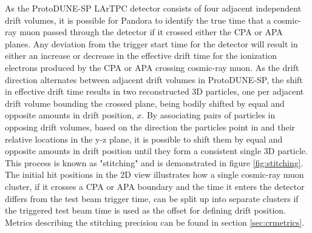 As the ProtoDUNE-SP LArTPC detector consists of four adjacent independent drift volumes, it is possible for Pandora to identify the true time that a cosmic-ray muon passed through the detector if it crossed either the CPA or APA planes.  Any deviation from the trigger start time for the detector will result in either an increase or decrease in the effective drift time for the ionization electrons produced by the CPA or APA crossing cosmic-ray muon.  As the drift direction alternates between adjacent drift volumes in ProtoDUNE-SP, the shift in effective drift time results in two reconstructed 3D particles, one per adjacent drift volume bounding the crossed plane, being bodily shifted by equal and opposite amounts in drift position, $x$.  By associating pairs of particles in opposing drift volumes, based on the direction the particles point in and their relative locations in the y-z plane, it is possible to shift them by equal and opposite amounts in drift position until they form a consistent single 3D particle.  This process is known as "stitching" and is demonstrated in figure \ref{fig:stitching}.  The initial hit positions in the 2D view illustrates how a single cosmic-ray muon cluster, if it crosses a CPA or APA boundary and the time it enters the detector differs from the test beam trigger time, can be split up into separate clusters if the triggered test beam time is used as the offset for defining drift position.  Metrics describing the stitching precision can be found in section \ref{sec:crmetrics}.

